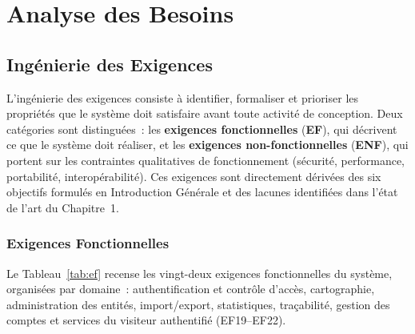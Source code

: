 \documentclass[12pt, a4paper]{report}
\begin{document}
\section{Analyse des Besoins}
\label{sec:analyse}

\subsection{Ingénierie des Exigences}
\label{ssec:exigences}

L'ingénierie des exigences consiste à identifier, formaliser et prioriser les
propriétés que le système doit satisfaire avant toute activité de conception.
Deux catégories sont distinguées~: les \textbf{exigences fonctionnelles}
(\textbf{EF}), qui décrivent ce que le système doit réaliser, et les
\textbf{exigences non-fonctionnelles} (\textbf{ENF}), qui portent sur les
contraintes qualitatives de fonctionnement (sécurité, performance, portabilité,
interopérabilité). Ces exigences sont directement dérivées des six objectifs
formulés en Introduction Générale et des lacunes identifiées dans l'état de
l'art du Chapitre~1.

\subsubsection{Exigences Fonctionnelles}

Le Tableau~\ref{tab:ef} recense les vingt-deux exigences fonctionnelles du système,
organisées par domaine~: authentification et contrôle d'accès, cartographie,
administration des entités, import/export, statistiques, traçabilité, gestion
des comptes et services du visiteur authentifié (EF19--EF22).
\end{document}
